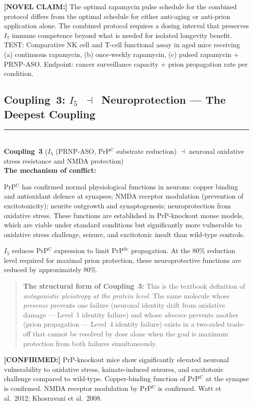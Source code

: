 \documentclass[12pt,a4paper]{article}
\newcommand{\prpc}{PrP$^{\mathrm{C}}$}
\newcommand{\prpsc}{PrP$^{\mathrm{Sc}}$}
\newcommand{\novel}[1]{\noindent\colorbox{yellow!18}{\parbox{\dimexpr\linewidth-2\fboxsep}{%
  \textbf{[NOVEL CLAIM:]} #1}}\vspace{0.4em}}
\newcommand{\confirmed}[1]{\noindent\colorbox{green!10}{\parbox{\dimexpr\linewidth-2\fboxsep}{%
  \textbf{[CONFIRMED:]} #1}}\vspace{0.4em}}
\newcommand{\Inet}[1]{$I_{#1}$}
\newcommand{\coupling}[2]{\medskip\noindent\rule{\linewidth}{0.4pt}\\
  \textbf{Coupling~#1} (#2)\\[0.3em]}
\begin{document}
\novel{The optimal rapamycin pulse schedule for the combined protocol differs
from the optimal schedule for either anti-aging or anti-prion application
alone. The combined protocol requires a dosing interval that preserves
\Inet{7} immune competence beyond what is needed for isolated longevity
benefit. TEST: Comparative NK cell and T-cell functional assay in aged mice
receiving (a) continuous rapamycin, (b) once-weekly rapamycin, (c) pulsed
rapamycin + PRNP-ASO. Endpoint: cancer surveillance capacity + prion
propagation rate per condition.}

\subsection{Coupling~3: \texorpdfstring{\Inet{5}~$\dashv$~Neuroprotection}{I5 -| Neuroprotection}
--- The Deepest Coupling}

\coupling{3}{\Inet{5} (PRNP-ASO, \prpc{} substrate reduction)
$\dashv$ neuronal oxidative stress resistance and NMDA protection}

\textbf{The mechanism of conflict:}

\prpc{} has confirmed normal physiological functions in neurons:
copper binding and antioxidant defence at synapses; NMDA receptor modulation
(prevention of excitotoxicity); neurite outgrowth and synaptogenesis;
neuroprotection from oxidative stress. These functions are established in
PrP-knockout mouse models, which are viable under standard conditions but
significantly more vulnerable to oxidative stress challenge, seizure, and
excitotoxic insult than wild-type controls.

\Inet{5} reduces \prpc{} expression to limit \prpsc{} propagation. At the
80\% reduction level required for maximal prion protection, these
neuroprotective functions are reduced by approximately 80\%.

\begin{quote}
\textbf{The structural form of Coupling~3:} This is the textbook definition
of \textit{antagonistic pleiotropy at the protein level}. The same molecule
whose \textit{presence} prevents one failure (neuronal identity drift from
oxidative damage --- Level~1 identity failure) and whose \textit{absence}
prevents another (prion propagation --- Level~4 identity failure) exists in
a two-sided trade-off that cannot be resolved by dose alone when the goal is
maximum protection from both failures simultaneously.
\end{quote}

\confirmed{PrP-knockout mice show significantly elevated neuronal
vulnerability to oxidative stress, kainate-induced seizures, and excitotoxic
challenge compared to wild-type. Copper-binding function of \prpc{} at the
synapse is confirmed. NMDA receptor modulation by \prpc{} is confirmed.
Watt et al.\ 2012; Khosravani et al.\ 2008.}
\end{document}

